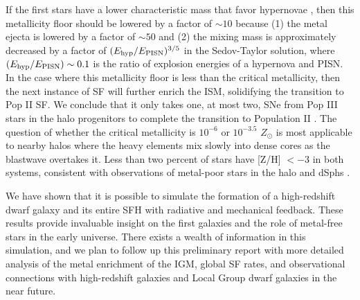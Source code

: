 \documentclass[apjl]{emulateapj}
\newcommand{\tvir}{\ifmmode{T_{\rm{vir}}}\else{$T_{\rm{vir}}$}\fi}
\newcommand\tento[1]{$10^{#1}$}
\begin{document}
If the first stars have a lower characteristic mass that favor
hypernovae \citep{Tumlinson07_IMF}, then this metallicity floor should
be lowered by a factor of $\sim 10$ because (1) the metal ejecta is
lowered by a factor of $\sim 50$ and (2) the mixing mass is
approximately decreased by a factor of $(E_{\rm hyp}/E_{\rm
  PISN})^{3/5}$ in the Sedov-Taylor solution, where $(E_{\rm
  hyp}/E_{\rm PISN}) \sim 0.1$ is the ratio of explosion energies of a
hypernova and PISN.  In the case where this metallicity floor is less
than the critical metallicity, then the next instance of SF will
further enrich the ISM, solidifying the transition to Pop II SF.  We
conclude that it only takes one, at most two, SNe from Pop III stars
in the halo progenitors to complete the transition to Population II
\citep{Frebel10}.  The question of whether the critical metallicity is
\tento{-6} or \tento{-3.5} $Z_\odot$ is most applicable to nearby
halos where the heavy elements mix slowly into dense cores as the
blastwave overtakes it.  Less than two percent of stars have [Z/H] $<
-3$ in both systems, consistent with observations of metal-poor stars
in the halo and dSphs \citep{Beers05, Battaglia10}.


We have shown that it is possible to simulate the formation of a
high-redshift dwarf galaxy and its entire SFH with radiative and
mechanical feedback.  These results provide invaluable insight on the
first galaxies and the role of metal-free stars in the early universe.
There exists a wealth of information in this simulation, and we plan
to follow up this preliminary report with more detailed analysis of
the metal enrichment of the IGM, global SF rates, and observational
connections with high-redshift galaxies and Local Group dwarf galaxies
in the near future.
\end{document}
